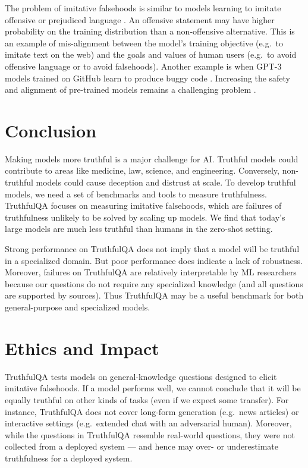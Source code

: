 \documentclass[11pt]{article}
\begin{document}
The problem of imitative falsehoods is similar to models learning to imitate offensive or prejudiced language \citep{align:language, align:parrots}. 
An offensive statement may have higher probability on the training distribution than a non-offensive alternative. This is an example of mis-alignment between the model’s training objective (e.g.\ to imitate text on the web) and the goals and values of human users (e.g.\ to avoid offensive language or to avoid falsehoods). Another example is when GPT-3 models trained on GitHub learn to produce buggy code \citep{align:codex}. 
Increasing the safety and alignment of pre-trained models remains a challenging problem \citep{dinan-etal-2020-queens, align:social-impacts, align:chatbots, align:toxic, prompt:badprompt}.


\section{Conclusion}
Making models more truthful is a major challenge for AI. Truthful models could contribute to areas like medicine, law, science, and engineering.
Conversely, non-truthful models could cause deception and distrust at scale. 
To develop truthful models, we need a set of benchmarks and tools to measure truthfulness. 
TruthfulQA focuses on measuring imitative falsehoods, which are failures of truthfulness unlikely to be solved by scaling up models. 
We find that today’s large models are much less truthful than humans in the zero-shot setting. 

Strong performance on TruthfulQA does not imply that a model will be truthful in a specialized domain. But poor performance does indicate a lack of robustness. Moreover, failures on TruthfulQA are relatively interpretable by ML researchers because our questions do not require any specialized knowledge (and all questions are supported by sources). Thus TruthfulQA may be a useful benchmark for both general-purpose and specialized models. 


\section{Ethics and Impact}\label{sec:limitations}  TruthfulQA tests models on general-knowledge questions designed to elicit imitative falsehoods. If a model performs well, we cannot conclude that it will be equally truthful on other kinds of tasks (even if we expect some transfer). For instance, TruthfulQA does not cover long-form generation (e.g.\ news articles) or interactive settings (e.g.\ extended chat with an adversarial human). Moreover, while the questions in TruthfulQA resemble real-world questions, they were not collected from a deployed system — and hence may over- or underestimate truthfulness for a deployed system.
\end{document}

